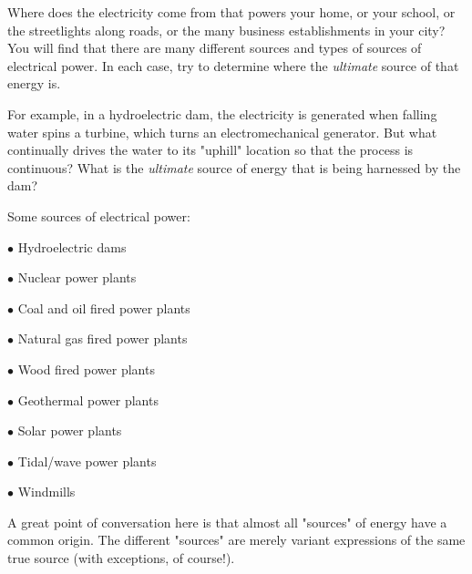 

Where does the electricity come from that powers your home, or your school, or the streetlights along roads, or the many business establishments in your city?  You will find that there are many different sources and types of sources of electrical power.  In each case, try to determine where the {\it ultimate} source of that energy is.

For example, in a hydroelectric dam, the electricity is generated when falling water spins a turbine, which turns an electromechanical generator.  But what continually drives the water to its "uphill" location so that the process is continuous?  What is the {\it ultimate} source of energy that is being harnessed by the dam?







Some sources of electrical power:

\medskip
\item{$\bullet$} Hydroelectric dams
\item{$\bullet$} Nuclear power plants
\item{$\bullet$} Coal and oil fired power plants
\item{$\bullet$} Natural gas fired power plants
\item{$\bullet$} Wood fired power plants
\item{$\bullet$} Geothermal power plants
\item{$\bullet$} Solar power plants
\item{$\bullet$} Tidal/wave power plants
\item{$\bullet$} Windmills
\medskip







A great point of conversation here is that almost all "sources" of energy have a common origin.  The different "sources" are merely variant expressions of the same true source (with exceptions, of course!).





